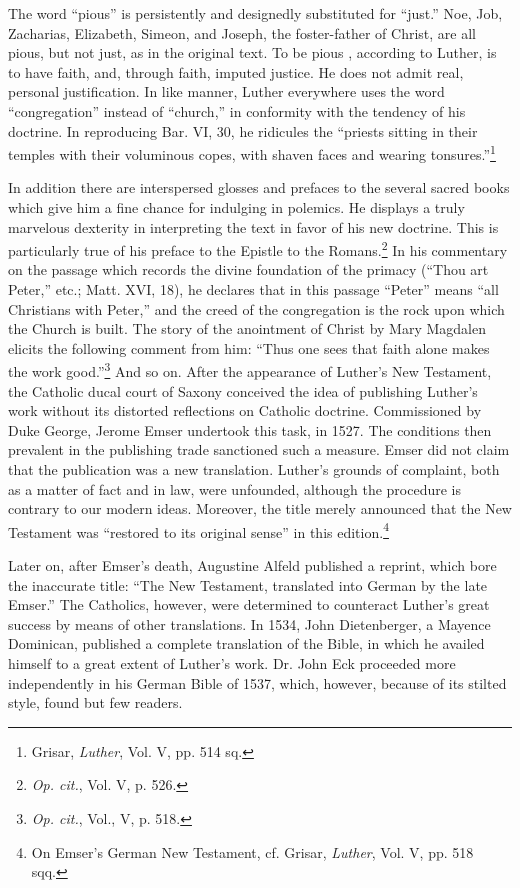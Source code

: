 The word “pious” is persistently and designedly substituted for “just.”
Noe, Job, Zacharias, Elizabeth, Simeon, and Joseph, the foster-father of
Christ, are all pious, but not just, as in the original text. To be pious
, according to Luther, is to have faith, and, through faith, imputed justice. He
does not admit real, personal justification. In like manner, Luther everywhere
uses the word “congregation” instead of “church,” in conformity
with the tendency of his doctrine. In reproducing Bar. VI, 30, he ridicules
the “priests sitting in their temples with their voluminous copes, with shaven
faces and wearing tonsures.”\footnote{Grisar, \textit{Luther}, Vol. V, pp. 514 sq.}


In addition there are interspersed glosses and prefaces to the several
sacred books which give him a fine chance for indulging in polemics.
He displays a truly marvelous dexterity in interpreting the text in
favor of his new doctrine. This is particularly true of his preface to
the Epistle to the Romans.\footnote{\textit{Op. cit.}, Vol. V, p. 526.}
 In his commentary on the passage which
records the divine foundation of the primacy (“Thou art Peter,” etc.;
Matt. XVI, 18), he declares that in this passage “Peter” means “all
Christians with Peter,” and the creed of the congregation is the rock
upon which the Church is built. The story of the anointment of
Christ by Mary Magdalen elicits the following comment from him:
“Thus one sees that faith alone makes the work good.”\footnote{\textit{Op. cit.}, Vol., V, p. 518.}
 And so on.
After the appearance of Luther’s New Testament, the Catholic
ducal court of Saxony conceived the idea of publishing Luther’s work
without its distorted reflections on Catholic doctrine. Commissioned
by Duke George, Jerome Emser undertook this task, in 1527. The
conditions then prevalent in the publishing trade sanctioned such a
measure. Emser did not claim that the publication was a new translation.
Luther’s grounds of complaint, both as a matter of fact and
in law, were unfounded, although the procedure is contrary to our
modern ideas. Moreover, the title merely announced that the New
Testament was “restored to its original sense” in this edition.\footnote{On Emser’s German New Testament, cf. Grisar, \textit{Luther}, Vol. V, pp. 518 sqq.}

Later on, after Emser’s death, Augustine Alfeld published a reprint, which
bore the inaccurate title: “The New Testament, translated into German
by the late Emser.” The Catholics, however, were determined to
counteract Luther’s great success by means of other translations. In
1534, John Dietenberger, a Mayence Dominican, published a complete
translation of the Bible, in which he availed himself to a great
extent of Luther’s work. Dr. John Eck proceeded more independently in
his German Bible of 1537, which, however, because of its
stilted style, found but few readers.

